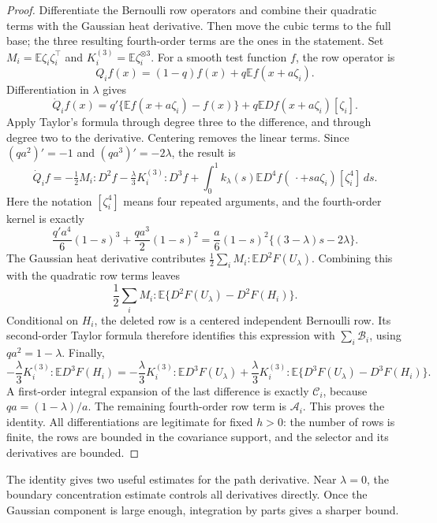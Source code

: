 \documentclass[11pt,letterpaper]{article}
\theoremstyle{remark}
\newcommand{\E}{\mathbb E}
\newcommand{\dd}{\,d}
\begin{document}
\begin{proof}
Differentiate the Bernoulli row operators and combine their quadratic
terms with the Gaussian heat derivative. Then move the cubic terms
to the full base; the three resulting fourth-order terms are the ones
in the statement. Set \(M_i=\E\zeta_i\zeta_i^\top\) and
\(K_i^{(3)}=\E\zeta_i^{\otimes3}\).  For a smooth test function
\(f\), the row operator is
\[
 Q_if(x)=(1-q)f(x)+q\E f(x+a\zeta_i).
\]
Differentiation in \(\lambda\) gives
\[
 \dot Q_if(x)=q'\{\E f(x+a\zeta_i)-f(x)\}
                  +q\E Df(x+a\zeta_i)[\zeta_i].
\]
Apply Taylor's formula through degree three to the difference, and
through degree two to the derivative.  Centering removes the linear
terms.  Since \((qa^2)'=-1\) and \((qa^3)'=-2\lambda\), the result is
\[
 \dot Q_if
 =-\tfrac12 M_i:D^2f
   -\tfrac\lambda3 K_i^{(3)}:D^3f
   +\int_0^1k_\lambda(s)
        \E D^4f(\,\cdot+sa\zeta_i)[\zeta_i^4]\dd s.
\]
Here the notation \([\zeta_i^4]\) means four repeated arguments,
and the fourth-order kernel is exactly
\[
 \frac{q'a^4}{6}(1-s)^3+\frac{qa^3}{2}(1-s)^2
 =\frac a6(1-s)^2\{(3-\lambda)s-2\lambda\}.
\]
The Gaussian heat derivative contributes
\(\tfrac12\sum_iM_i:\E D^2F(U_\lambda)\).  Combining this with
the quadratic row terms leaves
\[
 \frac12\sum_i M_i:
             \E\{D^2F(U_\lambda)-D^2F(H_i)\}.
\]
Conditional on \(H_i\), the deleted row is a centered independent
Bernoulli row.  Its second-order Taylor formula therefore identifies
this expression with \(\sum_i\mathcal B_i\), using \(qa^2=1-\lambda\).
Finally,
\[
 -\frac\lambda3 K_i^{(3)}:\E D^3F(H_i)
 =-\frac\lambda3 K_i^{(3)}:\E D^3F(U_\lambda)
   +\frac\lambda3 K_i^{(3)}:
          \E\{D^3F(U_\lambda)-D^3F(H_i)\}.
\]
A first-order integral expansion of the last difference is exactly
\(\mathcal C_i\), because \(qa=(1-\lambda)/a\).  The remaining
fourth-order row term is \(\mathcal A_i\).  This proves the identity.
All differentiations are legitimate for fixed \(h>0\): the number
of rows is finite, the rows are bounded in the covariance support,
and the selector and its derivatives are bounded.
\end{proof}

The identity gives two useful estimates for the path derivative.
Near \(\lambda=0\), the boundary concentration estimate controls all
derivatives directly.  Once the Gaussian component is large enough,
integration by parts gives a sharper bound.
\end{document}
